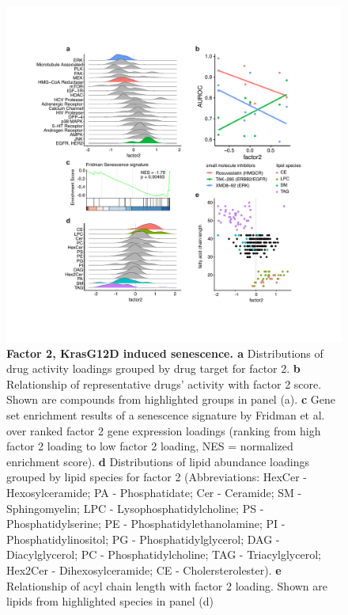 \begin{flushleft}
\begin{figure}[h]
\centering
\includegraphics[scale=0.75,
                keepaspectratio]{figures/adenomaprofiling/pdf/fig_3_1.pdf}
\caption{\textbf{Factor 2, KrasG12D induced senescence. a} Distributions of drug activity loadings grouped by drug target for factor 2. \textbf{b} Relationship of representative drugs’ activity with factor 2 score. Shown are compounds from highlighted groups in panel (a). \textbf{c} Gene set enrichment results of a senescence signature by Fridman et al. over ranked factor 2 gene expression loadings (ranking from high factor 2 loading to low factor 2 loading, NES = normalized enrichment score). \textbf{d} Distributions of lipid abundance loadings grouped by lipid species for factor 2 (Abbreviations: HexCer - Hexosylceramide; PA - Phosphatidate; Cer - Ceramide; SM - Sphingomyelin; LPC - Lysophosphatidylcholine; PS - Phosphatidylserine; PE - Phosphatidylethanolamine; PI - Phosphatidylinositol; PG - Phosphatidylglycerol; DAG - Diacylglycerol; PC - Phosphatidylcholine; TAG - Triacylglycerol; Hex2Cer - Dihexosylceramide; CE - Cholersterolester). \textbf{e} Relationship of acyl chain length with factor 2 loading. Shown are lipids from highlighted species in panel (d)}
\label{fig_200}
\end{figure}
\bigbreak




\end{flushleft}
